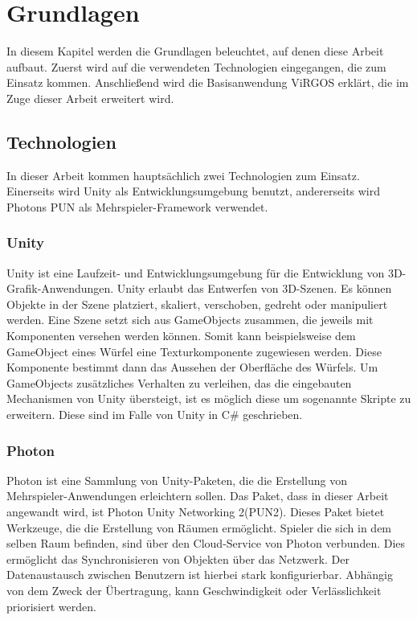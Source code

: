 \section{Grundlagen}
In diesem Kapitel werden die Grundlagen beleuchtet, auf denen diese Arbeit aufbaut. Zuerst wird auf die verwendeten Technologien eingegangen, die zum Einsatz kommen. Anschließend wird die Basisanwendung ViRGOS erklärt, die im Zuge dieser Arbeit erweitert wird. 

\subsection{Technologien}

In dieser Arbeit kommen hauptsächlich zwei Technologien zum Einsatz. Einerseits wird Unity als Entwicklungsumgebung benutzt, andererseits wird Photons PUN als Mehrspieler-Framework verwendet. 

\subsubsection*{Unity}
Unity ist eine Laufzeit- und Entwicklungsumgebung für die Entwicklung von 3D-Grafik-Anwendungen. Unity erlaubt das Entwerfen von 3D-Szenen. Es können Objekte in der Szene platziert, skaliert, verschoben, gedreht oder manipuliert werden. Eine Szene setzt sich aus GameObjects zusammen, die jeweils mit Komponenten versehen werden können. Somit kann beispielsweise dem GameObject eines Würfel eine Texturkomponente zugewiesen werden. Diese Komponente bestimmt dann das Aussehen der Oberfläche des Würfels. Um GameObjects zusätzliches Verhalten zu verleihen, das die eingebauten Mechanismen von Unity übersteigt, ist es möglich diese um sogenannte Skripte zu erweitern. Diese sind im Falle von Unity in C\# geschrieben.

\subsubsection*{Photon}
Photon ist eine Sammlung von Unity-Paketen, die die Erstellung von Mehrspieler-Anwendungen erleichtern sollen. Das Paket, dass in dieser Arbeit angewandt wird, ist \glqq Photon Unity Networking 2\grqq  (PUN2). Dieses Paket bietet Werkzeuge, die die Erstellung von Räumen ermöglicht. Spieler die sich in dem selben Raum befinden, sind über den Cloud-Service von Photon verbunden. Dies ermöglicht das Synchronisieren von Objekten über das Netzwerk. Der Datenaustausch zwischen Benutzern ist hierbei stark konfigurierbar. Abhängig von dem Zweck der Übertragung, kann Geschwindigkeit oder Verlässlichkeit priorisiert werden.

